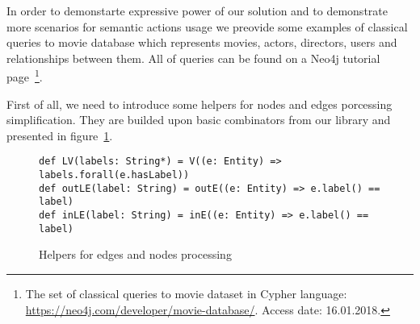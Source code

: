 In order to demonstarte expressive power of our solution and to demonstrate more scenarios for 
semantic actions usage we preovide some examples of classical queries to movie database which 
represents movies, actors, directors, users and relationships between them.
All of queries can be found on a Neo4j tutorial page~\footnote{The set of classical queries to movie dataset in Cypher language: \url{https://neo4j.com/developer/movie-database/}. Access date: 16.01.2018.}.

First of all, we need to introduce some helpers for nodes and edges porcessing simplification.
They are builded upon basic combinators from our library and presented in figure~\ref{fig:helpers}.

\begin{figure}[h]
\begin{lstlisting}
def LV(labels: String*) = V((e: Entity) => labels.forall(e.hasLabel))
def outLE(label: String) = outE((e: Entity) => e.label() == label)
def inLE(label: String) = inE((e: Entity) => e.label() == label)
\end{lstlisting}
\caption{Helpers for edges and nodes processing}
\label{fig:helpers}
\end{figure}

